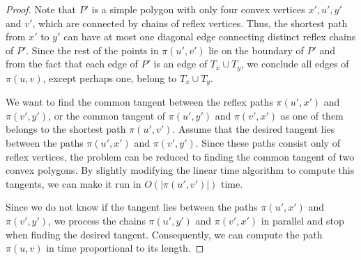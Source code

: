 \documentclass[a4paper]{article}
\newcommand{\p}[2]{\ensuremath{\pi(#1, #2)}}
\begin{document}
\begin{proof}
Note that $P'$ is a simple polygon with only four convex vertices $x',u', y'$ and $v'$, which are connected by chains of reflex vertices.
Thus, the shortest path from $x'$ to $y'$ can have at most one diagonal edge connecting distinct reflex chains of $P'$. Since the rest of the points in $\p{u'}{v'}$ lie on the boundary of $P'$ and from the fact that each edge of $P'$ is an edge of $T_x\cup T_y$, we conclude all edges of $\p{u}{v}$, except perhaps one, belong to $T_x\cup T_y$.

We want to find the common tangent between the reflex paths $\p{u'}{x'}$ and $\p{v'}{y'}$, or the common tangent of $\p{u'}{y'}$ and $\p{v'}{x'}$ as one of them belongs to the shortest path $\p{u'}{v'}$.
Assume that the desired tangent lies between the paths $\p{u'}{x'}$ and $\p{v'}{y'}$. 
Since these paths consist only of reflex vertices, the problem can be reduced to finding the common tangent of two convex polygons. 
By slightly modifying the linear time algorithm to compute this tangents, we can make it run in $O(|\p{u'}{v'}|)$ time.

Since we do not know if the tangent lies between the paths $\p{u'}{x'}$ and $\p{v'}{y'}$, we process the chains $\p{u'}{y'}$ and $\p{v'}{x'}$ in parallel and stop when finding the desired tangent. Consequently, we can compute the path $\p{u}{v}$ in time proportional to its length. 
\end{proof}
\end{document}
